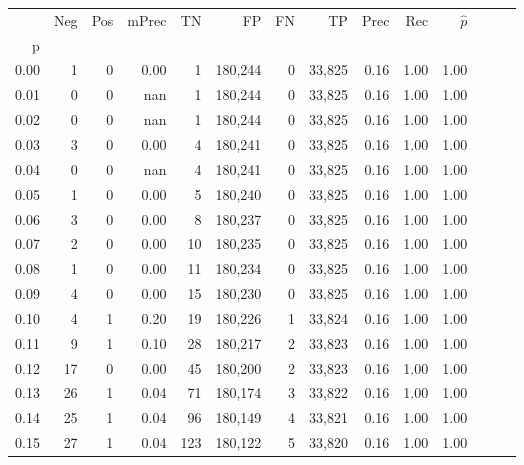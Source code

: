 \begin{tabular}{rrrrrrrrrrrrrr}
\toprule
{} &    Neg &    Pos & mPrec &       TN &       FP &      FN &      TP &  Prec &   Rec & $\hat{p}$ \\
p    &        &        &       &          &          &         &         &       &       &           \\
\midrule
0.00 &      1 &      0 &  0.00 &        1 &  180,244 &       0 &  33,825 &  0.16 &  1.00 &      1.00 \\
0.01 &      0 &      0 &   nan &        1 &  180,244 &       0 &  33,825 &  0.16 &  1.00 &      1.00 \\
0.02 &      0 &      0 &   nan &        1 &  180,244 &       0 &  33,825 &  0.16 &  1.00 &      1.00 \\
0.03 &      3 &      0 &  0.00 &        4 &  180,241 &       0 &  33,825 &  0.16 &  1.00 &      1.00 \\
0.04 &      0 &      0 &   nan &        4 &  180,241 &       0 &  33,825 &  0.16 &  1.00 &      1.00 \\
0.05 &      1 &      0 &  0.00 &        5 &  180,240 &       0 &  33,825 &  0.16 &  1.00 &      1.00 \\
0.06 &      3 &      0 &  0.00 &        8 &  180,237 &       0 &  33,825 &  0.16 &  1.00 &      1.00 \\
0.07 &      2 &      0 &  0.00 &       10 &  180,235 &       0 &  33,825 &  0.16 &  1.00 &      1.00 \\
0.08 &      1 &      0 &  0.00 &       11 &  180,234 &       0 &  33,825 &  0.16 &  1.00 &      1.00 \\
0.09 &      4 &      0 &  0.00 &       15 &  180,230 &       0 &  33,825 &  0.16 &  1.00 &      1.00 \\
0.10 &      4 &      1 &  0.20 &       19 &  180,226 &       1 &  33,824 &  0.16 &  1.00 &      1.00 \\
0.11 &      9 &      1 &  0.10 &       28 &  180,217 &       2 &  33,823 &  0.16 &  1.00 &      1.00 \\
0.12 &     17 &      0 &  0.00 &       45 &  180,200 &       2 &  33,823 &  0.16 &  1.00 &      1.00 \\
0.13 &     26 &      1 &  0.04 &       71 &  180,174 &       3 &  33,822 &  0.16 &  1.00 &      1.00 \\
0.14 &     25 &      1 &  0.04 &       96 &  180,149 &       4 &  33,821 &  0.16 &  1.00 &      1.00 \\
0.15 &     27 &      1 &  0.04 &      123 &  180,122 &       5 &  33,820 &  0.16 &  1.00 &      1.00 \\

\end{tabular}
